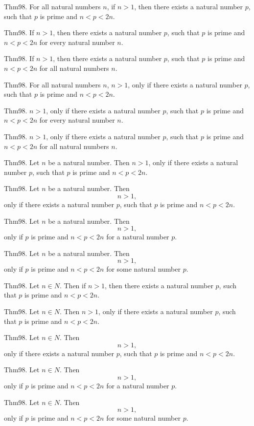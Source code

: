 \documentclass{article}
\begin{document}
Thm98. For all natural numbers $n$, if $n > 1$, then there exists a natural number $p$, such that $p$ is prime and $n < p < 2 n$.

Thm98. If $n > 1$, then there exists a natural number $p$, such that $p$ is prime and $n < p < 2 n$ for every natural number $n$.

Thm98. If $n > 1$, then there exists a natural number $p$, such that $p$ is prime and $n < p < 2 n$ for all natural numbers $n$.

Thm98. For all natural numbers $n$, $n > 1$, only if there exists a natural number $p$, such that $p$ is prime and $n < p < 2 n$.

Thm98. $n > 1$, only if there exists a natural number $p$, such that $p$ is prime and $n < p < 2 n$ for every natural number $n$.

Thm98. $n > 1$, only if there exists a natural number $p$, such that $p$ is prime and $n < p < 2 n$ for all natural numbers $n$.

Thm98. Let $n$ be a natural number. Then $n > 1$, only if there exists a natural number $p$, such that $p$ is prime and $n < p < 2 n$.

Thm98. Let $n$ be a natural number. Then $$n > 1,$$ only if there exists a natural number $p$, such that $p$ is prime and $n < p < 2 n$.

Thm98. Let $n$ be a natural number. Then $$n > 1,$$ only if $p$ is prime and $n < p < 2 n$ for a natural number $p$.

Thm98. Let $n$ be a natural number. Then $$n > 1,$$ only if $p$ is prime and $n < p < 2 n$ for some natural number $p$.

Thm98. Let $n \in N$. Then if $n > 1$, then there exists a natural number $p$, such that $p$ is prime and $n < p < 2 n$.

Thm98. Let $n \in N$. Then $n > 1$, only if there exists a natural number $p$, such that $p$ is prime and $n < p < 2 n$.

Thm98. Let $n \in N$. Then $$n > 1,$$ only if there exists a natural number $p$, such that $p$ is prime and $n < p < 2 n$.

Thm98. Let $n \in N$. Then $$n > 1,$$ only if $p$ is prime and $n < p < 2 n$ for a natural number $p$.

Thm98. Let $n \in N$. Then $$n > 1,$$ only if $p$ is prime and $n < p < 2 n$ for some natural number $p$.
\end{document}
